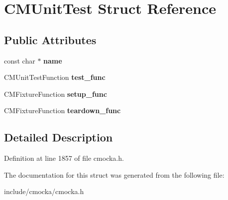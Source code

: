\hypertarget{structCMUnitTest}{}\section{C\+M\+Unit\+Test Struct Reference}
\label{structCMUnitTest}
\subsection*{Public Attributes}
\begin{DoxyCompactItemize}
\item 
\mbox{\label{structCMUnitTest_a115e636bc4fc5bc659542c31062d3a7e}} 
const char $\ast$ {\bfseries name}
\item 
\mbox{\label{structCMUnitTest_a4343f737815738bbe68cfc70ba9fe5ce}} 
C\+M\+Unit\+Test\+Function {\bfseries test\+\_\+func}
\item 
\mbox{\label{structCMUnitTest_a08ba500fe742b4f37fcce0f55b573d68}} 
C\+M\+Fixture\+Function {\bfseries setup\+\_\+func}
\item 
\mbox{\label{structCMUnitTest_a23673109a540c9e5f259fb86562a354a}} 
C\+M\+Fixture\+Function {\bfseries teardown\+\_\+func}
\end{DoxyCompactItemize}


\subsection{Detailed Description}


Definition at line 1857 of file cmocka.\+h.



The documentation for this struct was generated from the following file\+:\begin{DoxyCompactItemize}
\item 
include/cmocka/cmocka.\+h\end{DoxyCompactItemize}
